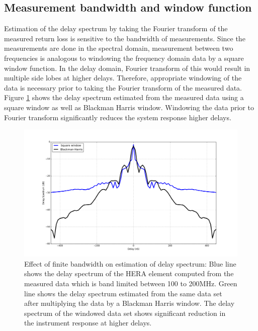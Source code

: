 \documentclass[twocolumn]{emulateapj}
\begin{document}
\subsection{\textbf{Measurement bandwidth and window function}}
Estimation of the delay spectrum by taking the Fourier transform of the measured return loss is sensitive to the bandwidth of measurements. Since the measurements are done in the spectral domain, measurement between two frequencies is analogous to windowing the frequency domain data by a square window function. In the delay domain, Fourier transform of this would result in multiple side lobes at higher delays. Therefore, appropriate windowing of the data is  necessary prior to taking the Fourier transform of the measured data. Figure \ref{fig:window} shows the delay spectrum estimated from the measured data using a square window as well as Blackman Harris window. Windowing the data prior to Fourier transform significantly reduces the system response higher delays.  
\begin{figure}
\centering
\includegraphics[width=\linewidth]{GB_reflectometry_part3/plot/ds_window.png}
\caption{Effect of finite bandwidth on estimation of delay spectrum: Blue line shows the delay spectrum of the HERA element computed from the measured data which is band limited between 100 to 200MHz. Green line shows the delay spectrum estimated from the same data set after multiplying the data by a Blackman Harris window. The delay spectrum of the windowed data set shows significant reduction in the instrument response at higher delays.}
\label{fig:window}
\end{figure} 
\end{document}

